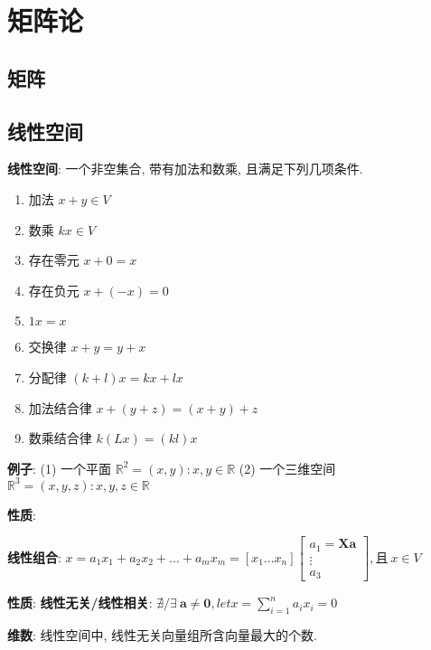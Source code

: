 \documentclass{article}
\title{}\date{} \setlength{\parindent}{0pt} \linespread{1.25}
\begin{document}
\tableofcontents

\section{矩阵论}
    \subsection{矩阵}

    \subsection{线性空间}
        \textbf{线性空间}: 一个非空集合, 带有加法和数乘, 且满足下列几项条件.
            \begin{enumerate}
                \item 加法   $x+y \in V$
                \item 数乘   $k x \in V$
                \item 存在零元 $x+0=x$
                \item 存在负元 $x+(-x) = 0$
                \item $1x = x$
                \item 交换律 $x+y = y+x$
                \item 分配律 $(k+l)x = kx+lx$
                \item 加法结合律 $x+(y+z) = (x+y) +z$
                \item 数乘结合律 $k(Lx) = (kl)x$
            \end{enumerate}
            
            \textbf{例子}:
                (1) 一个平面 $\mathbb R^2 = {(x,y): x, y\in \mathbb R}$
                (2) 一个三维空间 $\mathbb R^3 = {(x,y,z): x, y, z\in \mathbb R}$

            \textbf{性质}:


        \textbf{线性组合}: $x = a_1 x_1 +a_2 x_2+ ... +a_m x_m = [x_1 ... x_n] \begin{bmatrix} a_1 = \boldsymbol X \boldsymbol a\\ \vdots \\ a_3 \end{bmatrix}, \text{且}\ x \in V$

            \textbf{性质}: 
                \textbf{线性无关/线性相关}: $\nexists / \exists\ \boldsymbol a \neq \boldsymbol 0, let x = \sum\limits_{i=1}^n a_i x_i = 0$ 

        \textbf{维数}: 线性空间中, 线性无关向量组所含向量最大的个数.
        
\end{document}
